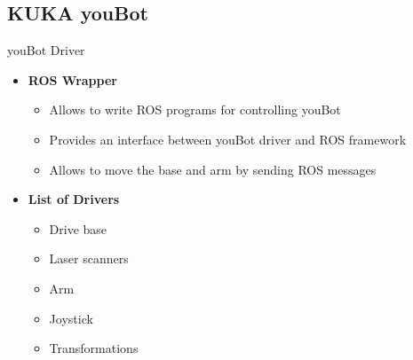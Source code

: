 \subsection{KUKA youBot}
\begin{frame}{youBot Driver}

\begin{itemize}
	\item \textbf{ROS Wrapper}
	\begin{itemize}
		\item Allows to write ROS programs for controlling youBot
		\item Provides an interface between youBot driver and ROS framework
		\item Allows to move the base and arm by sending ROS messages
	\end{itemize}
	\item \textbf{List of Drivers}
		\begin{itemize}
			\item Drive base
			\item Laser scanners
			\item Arm 
			\item Joystick
			\item Transformations
		\end{itemize}
\end{itemize}
  
\end{frame}

